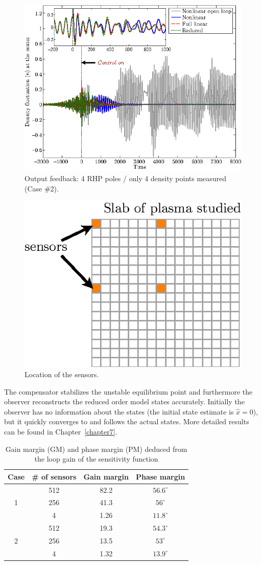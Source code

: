 \documentclass[12pt,lot, lof]{puthesis}
\begin{document}
\begin{figure}[htbp]
\centering
\includegraphics[width=0.9\linewidth]{observer3} 
\caption{Output feedback: 4 RHP poles / only 4 density points measured (Case \#2).}
\label{lqg4b}
\end{figure}

\begin{figure}[htbp]
\centering
\includegraphics[width=0.5\linewidth]{observer4}
\caption{Location of the sensors.}
\label{lqg4a}
\end{figure}

The compensator stabilizes the unstable equilibrium point and furthermore the observer reconstructs the reduced order model states accurately. Initially the observer has no information about the states (the initial state estimate is $\hat x = 0$), but it quickly converges to and follows the actual states. More detailed results can be found in Chapter~\ref{chapter7}.

\begin{table}[htbp]
	\centering
	\caption{Gain margin (GM) and phase margin (PM) deduced from the loop gain of the sensitivity function}
	\label{table4c}
	\begin{tabular}{cccc} \\[-0.5em] \hline
		Case & \# of sensors & Gain margin & Phase margin \\ \hline
		  & 512&82.2&$56.6^\circ$   \\ 
		1  & 256& 41.3&$56 ^\circ $\\ 
		  &4 & 1.26& $11.8^\circ$ \\ \hline
		  &512 &19.3 &$54.3^\circ$ \\ 
		2  &256 & 13.5& $53^\circ$ \\ 
		  &4 & 1.32& $13.9^\circ$\\ \hline
	\end{tabular}
\end{table}
\end{document}

